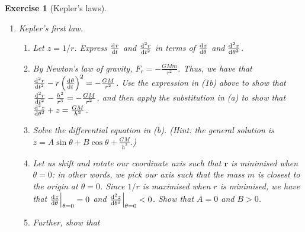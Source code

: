 \documentclass[a4paper,leqno,10pt]{article}
\theoremstyle{exercise}
\newtheorem{Exercise}{Exercise}
\newenvironment{exercise}
  {\begin{mdframed}\begin{Exercise}}
  {\end{Exercise}\end{mdframed}}
\theoremstyle{plain}
\theoremstyle{definition}
\theoremstyle{remark}
\newcommand{\df}{\textbf}
\renewcommand\vec{\mathbf}
\begin{document}
\begin{exercise}[Kepler's laws]
\begin{enumerate}
\begin{enumerate}
              Our force of gravity is a \df{central force}: it only acts in the direction of $ \vec{r} $. Hence the $ \theta$-component
              of the force acting on the mass $ m $ is zero. Show that
              \begin{displaymath}
                r^2 \od{\theta}{t} = h
              \end{displaymath}
              for some constant $ h $.
        \item Suppose $ A(t) $ gives the area `swept out' by the radius vector $ \vec{r} $ between some fixed time $ t_0 $
              and the time $ t $. Using the fact that $ \od{A}{\theta} = \frac{r^2}{2} $ (since $ \dif{A} = \pi r^2 \cdot \frac{\dif{\theta}}{2\pi} $),
              show that $ A(t_2) - A(t_1) = \frac{1}{2}h(t_2 - t_1) $. Conclude \df{Kepler's second law}: if $ P $ and $ Q $ are
              planets with associated masses $ m_P $ and $ m_Q $, then over a time $ \Delta t $ the planets will sweep out equal
              area.
      \end{enumerate}
    \item Kepler's first law.
      \begin{enumerate}
        \item Let $ z = 1/r $. Express $ \od{r}{t} $ and $ \od[2]{r}{t} $ in terms of $ \od{z}{\theta} $ and $ \od[2]{z}{\theta} $.
        \item By Newton's law of gravity, $ F_r = -\frac{GMm}{r^2} $. Thus, we have that $ \od[2]{r}{t} - r \left(\od{\theta}{t}\right)^2 = -\frac{GM}{r^2} $.
              Use the expression in (1b) above to show that $ \od[2]{r}{t} - \frac{h^2}{r^3} = -\frac{GM}{r^2} $, and then apply
              the substitution in (a) to show that $ \od[2]{z}{\theta} + z = \frac{GM}{h^2} $.
        \item Solve the differential equation in (b). (Hint: the general solution is $ z = A \sin \theta + B \cos \theta + \frac{GM}{h^2} $.)
        \item Let us shift and rotate our coordinate axis such that $ \vec{r} $ is minimised when $ \theta = 0 $: in other words, we pick
              our axis such that the mass $ m $ is closest to the origin at $ \theta = 0 $. Since $ 1/r $ is maximised when $ r $ is minimised,
              we have that $ \eval[2]{\od{z}{\theta}}_{\theta = 0} = 0 $ and $ \eval[2]{\od[2]{z}{\theta}}_{\theta = 0} < 0 $. Show that $ A = 0 $
              and $ B > 0 $.
        \item Further, show that
              \begin{displaymath}

\end{displaymath}
\end{enumerate}
\end{enumerate}
\end{exercise}
\end{document}
